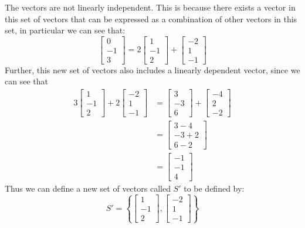 \documentclass{report}
\begin{document}
\sol The vectors are not linearly independent.  This is because there exists a vector in this set of vectors that can be expressed as a combination of other vectors in this set, in particular we can see that:
$$
\begin{bmatrix} 0 \\ -1 \\ 3 \end{bmatrix} =
2\begin{bmatrix} 1 \\ -1 \\ 2 \end{bmatrix} +
\begin{bmatrix} -2 \\ 1 \\ -1 \end{bmatrix}
$$
Further, this new set of vectors also includes a linearly dependent vector, since we can see that
$$
\begin{aligned}
	3\begin{bmatrix} 1 \\ -1 \\ 2 \end{bmatrix} +
	2\begin{bmatrix} -2 \\ 1 \\ -1 \end{bmatrix} & =
	\begin{bmatrix} 3 \\ -3 \\ 6 \end{bmatrix} +
	\begin{bmatrix} -4 \\ 2 \\ -2 \end{bmatrix} \\
	& =
	\begin{bmatrix} 3 - 4 \\ -3 + 2 \\ 6 - 2 \end{bmatrix} \\
	& =
	\begin{bmatrix} -1 \\ -1 \\ 4 \end{bmatrix}
\end{aligned}
$$
Thus we can define a new set of vectors called $S'$ to be defined by:
$$
S' = 
\left\{
\left[\begin{array}{c}
1 \\
-1 \\
2
\end{array}\right],\left[\begin{array}{c}
-2 \\
1 \\
-1
\end{array}\right]
\right\}
$$
\end{document}
